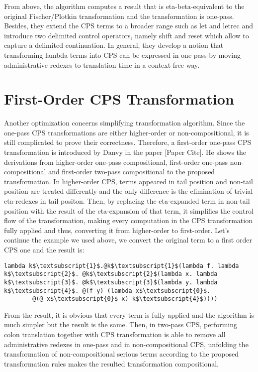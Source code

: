 From above, the algorithm computes a result that is eta-beta-equivalent to the original Fischer/Plotkin transformation and the transformation is one-pass. Besides, they extend the CPS terms to a broader range such as let and letrec and introduce two delimited control operators, namely shift and reset which allow to capture a delimited continuation. In general, they develop a notion that transforming lambda terms into CPS can be expressed in one pass by moving administrative redexes to translation time in a context-free way. 



\section{First-Order CPS Transformation}

Another optimization concerns simplifying transformation algorithm. Since the one-pass CPS transformations are either higher-order or non-compositional, it is still complicated to prove their correctness. Therefore, a first-order one-pass CPS transformation is introduced by Danvy in the paper [Paper Cite]. He shows the derivations from higher-order one-pass compositional, first-order one-pass non-compositional and first-order two-pass compositional to the proposed transformation. In higher-order CPS, terms appeared in tail position and non-tail position are treated differently and the only difference is the elimination of trivial eta-redexes in tail positon. Then, by replacing the eta-expanded term in non-tail position with the result of the eta-expansion of that term, it simplifies the control flow of the transformation, making every computation in the CPS transformation fully applied and thus, converting it from higher-order to first-order. Let's continue the example we used above, we convert the original term to a first order CPS one and the result is:
\begin{lstlisting}[language=Lambda]
	lambda k$\textsubscript{1}$.@k$\textsubscript{1}$(lambda f. lambda k$\textsubscript{2}$. @k$\textsubscript{2}$(lambda x. lambda k$\textsubscript{3}$. @k$\textsubscript{3}$(lambda y. lambda k$\textsubscript{4}$. @(f y) (lambda x$\textsubscript{0}$. 
		@(@ x$\textsubscript{0}$ x) k$\textsubscript{4}$))))
\end{lstlisting}

From the result, it is obvious that every term is fully applied and the algorithm is much simpler but the result is the same. Then, in two-pass CPS, performing colon translation together with CPS transformation is able to remove all administrative redexes in one-pass and in non-compositional CPS, unfolding the transformation of non-compositional serious terms according to the proposed transformation rules makes the resulted transformation compositional.

